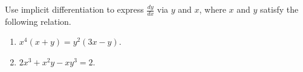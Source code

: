 Use implicit differentiation to express $\frac{dy}{dx}$ via $y $ and $x$, where $x$ and $y$ satisfy the following relation.
\begin{enumerate}
\item  $x^4(x+y)=y^2(3x-y)$.
\item $2x^3+x^2y-xy^3=2$.
\end{enumerate}
